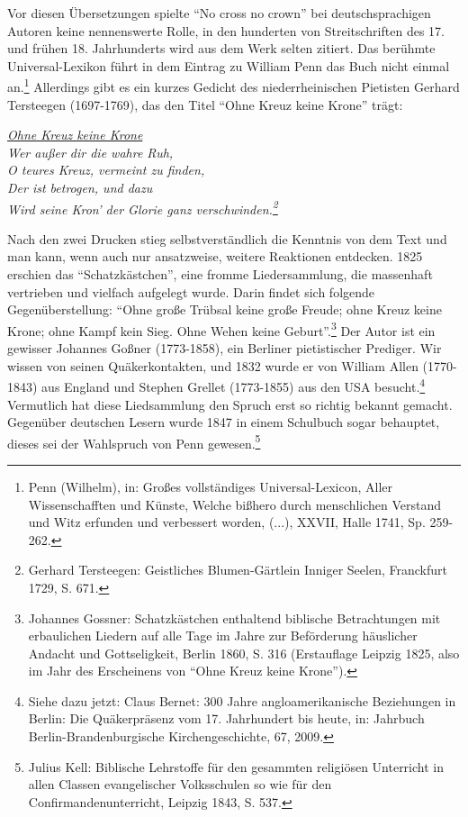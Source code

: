 \medskip

Vor diesen Übersetzungen spielte "`No cross no crown"' bei deutschsprachigen
Autoren keine nennenswerte Rolle, in den hunderten von Streitschriften des 17.
und frühen 18. Jahrhunderts wird aus dem Werk selten zitiert. Das berühmte
Universal-Lexikon führt in dem Eintrag zu William Penn das Buch nicht einmal
an.\footnote{Penn (Wilhelm), in: Großes vollständiges Universal-Lexicon, Aller
Wissenschafften und Künste, Welche bißhero durch menschlichen Verstand und Witz
erfunden und verbessert worden, (...), XXVII, Halle 1741, Sp. 259-262.}
Allerdings gibt es ein kurzes Gedicht des niederrheinischen Pietisten Gerhard
Tersteegen (1697-1769), das den Titel "`Ohne Kreuz keine Krone"' trägt:

\medskip
\begin{center}
\parbox{7,5cm}{
\textit{
\underline{Ohne Kreuz keine Krone\\}
Wer außer dir die wahre Ruh,\\
O teures Kreuz, vermeint zu finden,\\
Der ist betrogen, und dazu\\
Wird seine Kron’ der Glorie ganz verschwinden.\footnote{Gerhard Tersteegen:
Geistliches Blumen-Gärtlein Inniger Seelen, Franckfurt
1729, S. 671.}}
}
\end{center}

\medskip


Nach den zwei Drucken stieg selbstverständlich die Kenntnis von dem Text und man
kann, wenn auch nur ansatzweise, weitere Reaktionen entdecken. 1825 erschien das
"`Schatzkästchen"', eine fromme Liedersammlung, die massenhaft vertrieben und
vielfach aufgelegt wurde. Darin findet sich folgende Gegenüberstellung: "`Ohne
große Trübsal keine große Freude; ohne Kreuz keine Krone; ohne Kampf kein Sieg.
Ohne Wehen keine Geburt"'.\footnote{Johannes Gossner: Schatzkästchen enthaltend
biblische Betrachtungen mit
erbaulichen Liedern auf alle Tage im Jahre zur Beförderung häuslicher Andacht
und Gottseligkeit, Berlin 1860, S. 316 (Erstauflage Leipzig 1825, also im Jahr
des Erscheinens von "`Ohne Kreuz keine Krone"').} Der Autor ist ein gewisser
Johannes Goßner (1773-1858), ein Berliner pietistischer Prediger. Wir wissen von
seinen Quäkerkontakten, und 1832 wurde er von William Allen (1770-1843) aus
England und Stephen Grellet (1773-1855) aus den USA besucht.\footnote{Siehe dazu
jetzt: Claus Bernet: 300 Jahre angloamerikanische Beziehungen in
Berlin: Die Quäkerpräsenz vom 17. Jahrhundert bis heute, in: Jahrbuch
Berlin-Brandenburgische Kirchengeschichte, 67, 2009.} Vermutlich hat diese
Liedsammlung den Spruch erst so richtig bekannt gemacht. Gegenüber deutschen
Lesern wurde 1847 in einem Schulbuch sogar behauptet, dieses sei der Wahlspruch
von Penn gewesen.\footnote{Julius Kell: Biblische Lehrstoffe für den gesammten
religiösen Unterricht
in allen Classen evangelischer Volksschulen so wie für den
Confirmandenunterricht, Leipzig 1843, S. 537.}

